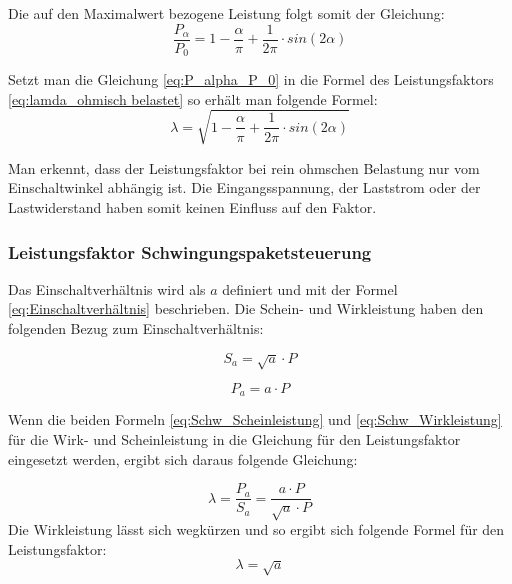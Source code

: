 Die auf den Maximalwert bezogene Leistung folgt somit der Gleichung:
\begin{equation}\label{eq:P_alpha_P_0}
\frac{P_{\alpha}}{P_0} = 1-\frac{\alpha}{\pi}+\frac{1}{2\pi} \cdot sin(2\alpha) 
\end{equation}

Setzt man die Gleichung \ref{eq:P_alpha_P_0} in die Formel des Leistungsfaktors \ref{eq:lamda_ohmisch belastet} so erhält man folgende Formel:
\begin{equation}\label{eq:lamda_p_n}
\lambda = \sqrt{1-\frac{\alpha}{\pi}+\frac{1}{2\pi} \cdot sin(2\alpha)}
\end{equation}

Man erkennt, dass der Leistungsfaktor bei rein ohmschen Belastung nur vom Einschaltwinkel abhängig ist. Die Eingangsspannung, der Laststrom oder der Lastwiderstand haben somit keinen Einfluss auf den Faktor.



\newpage
\subsubsection{Leistungsfaktor Schwingungspaketsteuerung}\label{sec:Leistungsfaktor_Schwingugnspaketsteuerung}

Das Einschaltverhältnis wird als $a$ definiert und mit der Formel \ref{eq:Einschaltverhältnis} beschrieben.
Die Schein- und Wirkleistung haben den folgenden Bezug zum Einschaltverhältnis:\cite{Leistungselektronik}

\begin{equation}\label{eq:Schw_Scheinleistung}
S_a = \sqrt{a} \cdot P 
\end{equation}

\begin{equation}\label{eq:Schw_Wirkleistung}
P_a = a \cdot P 
\end{equation}

Wenn die beiden Formeln \ref{eq:Schw_Scheinleistung} und \ref{eq:Schw_Wirkleistung} für die Wirk- und Scheinleistung in die Gleichung für den Leistungsfaktor eingesetzt werden, ergibt sich daraus folgende Gleichung: 

\begin{equation}
\lambda = \frac{P_a }{S_a} = \frac{a \cdot P}{\sqrt{a} \cdot P}
\end{equation}
Die Wirkleistung lässt sich wegkürzen und so ergibt sich folgende Formel für den Leistungsfaktor:
\begin{equation}\label{eq:lamda_s_n}
\lambda = \sqrt{a}
\end{equation}

